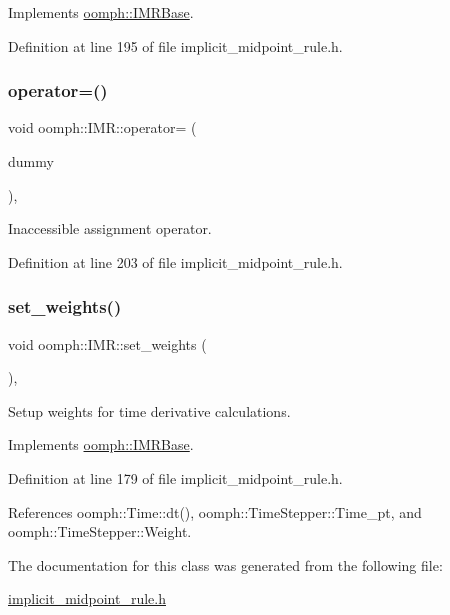Implements \hyperlink{classoomph_1_1IMRBase_a93df756c834f8ba27956b8efb2af3636}{oomph\+::\+I\+M\+R\+Base}.



Definition at line 195 of file implicit\+\_\+midpoint\+\_\+rule.\+h.

\mbox{\label{classoomph_1_1IMR_a694b371e73e3ee940e3473d9a9add90f}} 
\subsubsection{\texorpdfstring{operator=()}{operator=()}}
{\footnotesize\ttfamily void oomph\+::\+I\+M\+R\+::operator= (\begin{DoxyParamCaption}\item[{const \hyperlink{classoomph_1_1IMR}{I\+MR} \&}]{dummy }\end{DoxyParamCaption})\hspace{0.3cm}{\ttfamily [inline]}, {\ttfamily [private]}}



Inaccessible assignment operator. 



Definition at line 203 of file implicit\+\_\+midpoint\+\_\+rule.\+h.

\mbox{\label{classoomph_1_1IMR_aecea8cd9ec75a6e3efde89e451d714c4}} 
\subsubsection{\texorpdfstring{set\+\_\+weights()}{set\_weights()}}
{\footnotesize\ttfamily void oomph\+::\+I\+M\+R\+::set\+\_\+weights (\begin{DoxyParamCaption}{ }\end{DoxyParamCaption})\hspace{0.3cm}{\ttfamily [inline]}, {\ttfamily [virtual]}}



Setup weights for time derivative calculations. 



Implements \hyperlink{classoomph_1_1IMRBase_a36b8a37b4c0bb9e8cca821bfb74fd373}{oomph\+::\+I\+M\+R\+Base}.



Definition at line 179 of file implicit\+\_\+midpoint\+\_\+rule.\+h.



References oomph\+::\+Time\+::dt(), oomph\+::\+Time\+Stepper\+::\+Time\+\_\+pt, and oomph\+::\+Time\+Stepper\+::\+Weight.



The documentation for this class was generated from the following file\+:\begin{DoxyCompactItemize}
\item 
\hyperlink{implicit__midpoint__rule_8h}{implicit\+\_\+midpoint\+\_\+rule.\+h}\end{DoxyCompactItemize}
